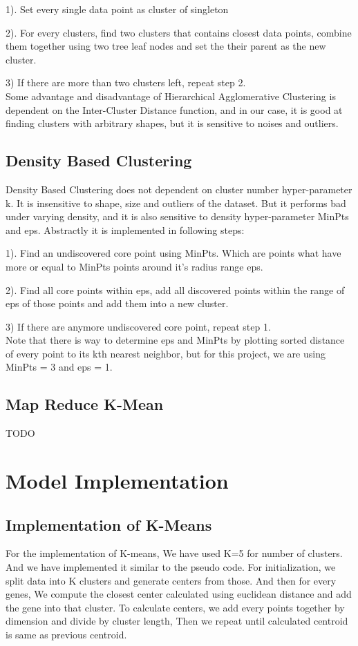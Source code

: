 \documentclass[fleqn]{llncs}
\begin{document}
1). Set every single data point as cluster of singleton

2). For every clusters, find two clusters that contains closest data points, combine them together using two tree leaf nodes and set the their parent as the new cluster.

3) If there are more than two clusters left, repeat step 2.\\
Some advantage and disadvantage of Hierarchical Agglomerative Clustering is dependent on the Inter-Cluster Distance function, and in our case, it is good at finding clusters with arbitrary shapes, but it is sensitive to noises and outliers. 

\subsection{Density Based Clustering}
Density Based Clustering does not dependent on cluster number hyper-parameter k. It is insensitive to shape, size and outliers of the dataset. But it performs bad under varying density, and it is also sensitive to density hyper-parameter MinPts and eps. Abstractly it is implemented in following steps:

1). Find an undiscovered core point using MinPts. Which are points what have more or equal to MinPts points around it's radius range eps.

2). Find all core points within eps, add all discovered points within the range of eps of those points and add them into a new cluster.

3) If there are anymore undiscovered core point, repeat step 1.\\
Note that there is way to determine eps and MinPts by plotting sorted distance of every point to its kth nearest neighbor, but for this project, we are using MinPts = 3 and eps = 1.
\subsection{Map Reduce K-Mean}
TODO
\section{Model Implementation}
\subsection{Implementation of K-Means}
For the implementation of K-means, We have used K=5 for number of clusters. And we have implemented it similar to the pseudo code. For initialization, we split data into K clusters and generate centers from those. And then for every genes, We compute the closest center calculated using euclidean distance and add the gene into that cluster. To calculate centers, we add every points together by dimension and divide by cluster length, Then we repeat until calculated centroid is same as previous centroid.
\end{document}
